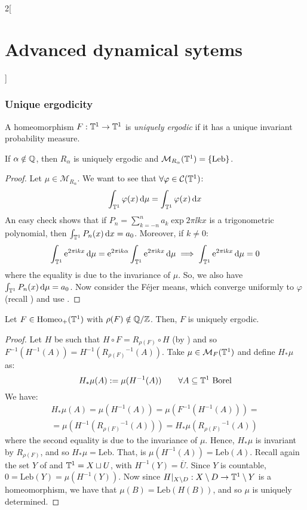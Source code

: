 \documentclass[../../../main_math.tex]{subfiles}
\begin{document}
\begin{multicols}{2}[\section{Advanced dynamical sytems}]
  \subsubsection{Unique ergodicity}
  \begin{definition}
    A homeomorphism $F:\mathbb{T}^1\to\mathbb{T}^1$ is \emph{uniquely ergodic} if it has a unique invariant probability measure.
  \end{definition}
  \begin{lemma}
    If $\alpha\notin \mathbb{Q}$, then $R_\alpha$ is uniquely ergodic and $\mathcal{M}_{R_\alpha}(\mathbb{T}^1)=\{\text{Leb}\}$.
  \end{lemma}
  \begin{proof}
    Let $\mu\in\mathcal{M}_{R_\alpha}$. We want to see that $\forall \varphi\in \mathcal{C}(\mathbb{T}^1)$:
    $$
      \int_{\mathbb{T}^1}\varphi(x)\dd{\mu}=\int_{\mathbb{T}^1}\varphi(x)\dd{x}
    $$
    An easy check shows that if $P_n=\sum_{k=-n}^na_k\exp{2\pi\ii k x}$ is a trigonometric polynomial, then $\int_{\mathbb{T}^1}P_n(x)\dd{x}=a_0$. Moreover, if $k\ne 0$:
    $$
      \int_{\mathbb{T}^1}\mathrm{e}^{2\pi\mathrm{i} kx}\dd{\mu}=\mathrm{e}^{2\pi\mathrm{i} k\alpha}\int_{\mathbb{T}^1}\mathrm{e}^{2\pi\mathrm{i} kx}\dd{\mu}\implies \int_{\mathbb{T}^1}\mathrm{e}^{2\pi\mathrm{i} kx}\dd{\mu}=0
    $$
    where the equality is due to the invariance of $\mu$. So, we also have $\int_{\mathbb{T}^1}P_n(x)\dd{\mu}=a_0$. Now consider the Féjer means, which converge uniformly to $\varphi$ (recall ) and use .
  \end{proof}
  \begin{proposition}\label{ADS:uniquely_ergodic}
    Let $F\in\mathrm{Homeo}_+(\mathbb{T}^1)$ with $\rho(F)\notin\quot{\QQ}{\ZZ}$. Then, $F$ is uniquely ergodic.
  \end{proposition}
  \begin{proof}
    Let $H$ be such that $H\circ F=R_{\rho(F)}\circ H$ (by ) and so $F^{-1}(H^{-1}(A))=H^{-1}({R_{\rho(F)}}^{-1}(A))$. Take $\mu\in\mathcal{M}_F(\mathbb{T}^1)$ and define $H_*\mu$ as:
    $$
      H_*\mu(A):=\mu(H^{-1}(A))\qquad \forall A\subseteq \mathbb{T}^1\text{ Borel}
    $$
    We have:
    \begin{multline*}
      H_*\mu(A)=\mu(H^{-1}(A))=\mu(F^{-1}(H^{-1}(A)))=\\=\mu(H^{-1}({R_{\rho(F)}}^{-1}(A)))=H_*\mu({R_{\rho(F)}}^{-1}(A))
    \end{multline*}
    where the second equality is due to the invariance of $\mu$. Hence, $H_*\mu$ is invariant by $R_{\rho(F)}$, and so $H_*\mu=\text{Leb}$. That, is $\mu(H^{-1}(A))=\text{Leb}(A)$. Recall again the set $Y$ of  and $\mathbb{T}^1=X\sqcup U$, with $H^{-1}(Y)=\overline{U}$. Since $Y$ is countable, $0=\text{Leb}(Y)=\mu(H^{-1}(Y))$. Now since $H|_{X\setminus D}:X\setminus D\to \mathbb{T}^1\setminus Y$ is a homeomorphism, we have that $\mu(B)=\text{Leb}(H(B))$, and so $\mu$ is uniquely determined.

\end{proof}
\end{multicols}
\end{document}
